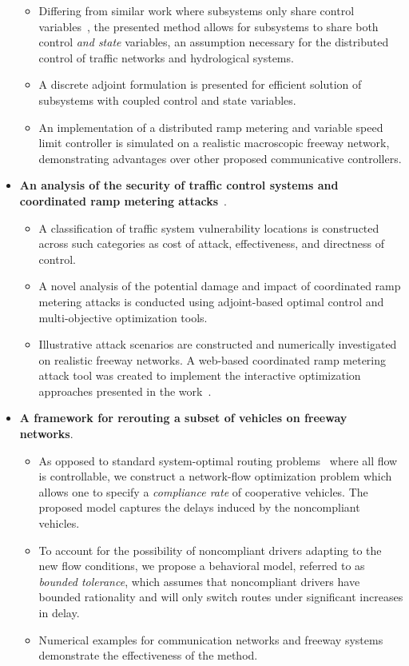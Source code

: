 \begin{itemize}
\begin{itemize}
		\item Differing from similar work where subsystems only share control variables~\cite{mota2012distributed,camponogara2009distributed}, the presented method allows for subsystems to share both control \emph{and state} variables, an assumption necessary for the distributed control of traffic networks and hydrological systems.
		\item A discrete adjoint formulation is presented for efficient solution of subsystems with coupled control and state variables.
		\item An implementation of a distributed ramp metering and variable speed limit controller is simulated on a realistic macroscopic freeway network, demonstrating advantages over other proposed communicative controllers.
	\end{itemize}
	\item \textbf{An analysis of the security of traffic control systems and coordinated ramp metering attacks}~\cite{Reilly2014c}.
	\begin{itemize}
		\item A classification of traffic system vulnerability locations is constructed across such categories as cost of attack, effectiveness, and directness of control.
		\item A novel analysis of the potential damage and impact of coordinated ramp metering attacks is conducted using adjoint-based optimal control and multi-objective optimization tools.
		\item Illustrative attack scenarios are constructed and numerically investigated on realistic freeway networks. A web-based coordinated ramp metering attack tool was created to implement the interactive optimization approaches presented in the work~\cite{smartroadswebsite}.
	\end{itemize}
	\item \textbf{A framework for rerouting a subset of vehicles on freeway networks}.
	\begin{itemize}
		\item As opposed to standard system-optimal routing problems~\cite{ziliaskopoulos2000linear,Kelly} where all flow is controllable, we construct a network-flow optimization problem which allows one to specify a \emph{compliance rate} of cooperative vehicles. The proposed model captures the delays induced by the noncompliant vehicles.
		\item To account for the possibility of noncompliant drivers adapting to the new flow conditions, we propose a behavioral model, referred to as \emph{bounded tolerance}, which assumes that noncompliant drivers have bounded rationality and will only switch routes under significant increases in delay.
		\item Numerical examples for communication networks and freeway systems demonstrate the effectiveness of the method.  
	\end{itemize}
\end{itemize}

